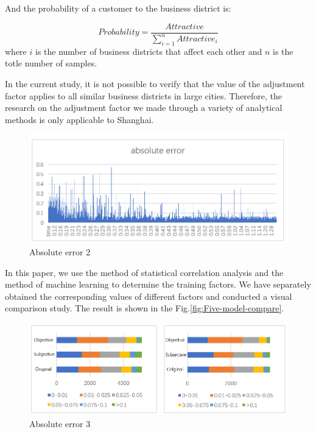 \documentclass[journal]{IEEEtran}
\begin{document}
And the probability of a customer to the business district is:

\begin{equation}
Probability=\frac{Attractive}{\sum_{i=1}^{n}Attractive_{i}}
\end{equation}
where $i$ is the number of business districts that affect each other and $n$ is the totle number of samples.

In the current study, it is not possible to verify that the value of the adjustment factor applies to all similar business districts in large cities. Therefore, the research on the adjustment factor we made through a variety of analytical methods is only applicable to Shanghai.

\begin{figure}[tb]
\centering
\includegraphics[width=1\columnwidth]{figure7.png}
\caption{Absolute error 2}
\label{fig:Absolute-error 2}
\end{figure}

In this paper, we use the method of statistical correlation analysis and the method of machine learning to determine the training factors. We have separately obtained the corresponding values of different factors and conducted a visual comparison study. The result is shown in the Fig.\ref{fig:Five-model-compare}.

\begin{figure}[tb]
\centering
\includegraphics[width=1\columnwidth]{figure8.png}
\caption{Absolute error 3}
\label{fig:Absolute-error 3}
\end{figure}
\end{document}
